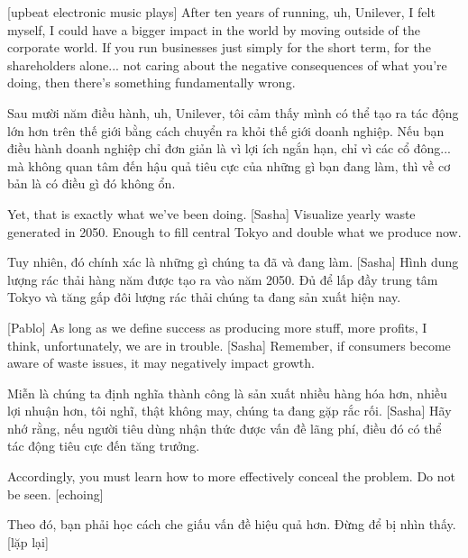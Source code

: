 \documentclass[a4paper]{article}
\begin{document}
	[upbeat electronic music plays]
	After ten years of running, uh, Unilever, I felt myself, I could have a bigger impact in the world by moving outside of the corporate world.
	If you run businesses just simply for the short term, for the shareholders alone... not caring about the negative consequences of what you're doing, then there's something fundamentally wrong.
	
	\begin{vietnamese-v2}
		Sau mười năm điều hành, uh, Unilever, tôi cảm thấy mình có thể tạo ra tác động lớn hơn trên thế giới bằng cách chuyển ra khỏi thế giới doanh nghiệp.
		Nếu bạn điều hành doanh nghiệp chỉ đơn giản là vì lợi ích ngắn hạn, chỉ vì các cổ đông... mà không quan tâm đến hậu quả tiêu cực của những gì bạn đang làm, thì về cơ bản là có điều gì đó không ổn.
	\end{vietnamese-v2}
	
	Yet, that is exactly what we've been doing.
	[Sasha] Visualize yearly waste generated in 2050.
	Enough to fill central Tokyo and double what we produce now.
	
	\begin{vietnamese-v2}
		Tuy nhiên, đó chính xác là những gì chúng ta đã và đang làm.
		[Sasha] Hình dung lượng rác thải hàng năm được tạo ra vào năm 2050.
		Đủ để lấp đầy trung tâm Tokyo và tăng gấp đôi lượng rác thải chúng ta đang sản xuất hiện nay.
	\end{vietnamese-v2}
	
	[Pablo] As long as we define success as producing more stuff, more profits, I think, unfortunately, we are in trouble.
	[Sasha] Remember, if consumers become aware of waste issues, it may negatively impact growth.
	
	\begin{vietnamese-v2}
		[Pablo] Miễn là chúng ta định nghĩa thành công là sản xuất nhiều hàng hóa hơn, nhiều lợi nhuận hơn, tôi nghĩ, thật không may, chúng ta đang gặp rắc rối.
		[Sasha] Hãy nhớ rằng, nếu người tiêu dùng nhận thức được vấn đề lãng phí, điều đó có thể tác động tiêu cực đến tăng trưởng.
	\end{vietnamese-v2}
	
	Accordingly, you must learn how to more effectively conceal the problem.
	Do not be seen. [echoing]
	
	\begin{vietnamese-v2}
		Theo đó, bạn phải học cách che giấu vấn đề hiệu quả hơn.
		Đừng để bị nhìn thấy. [lặp lại]
	\end{vietnamese-v2}
	
\end{document}
